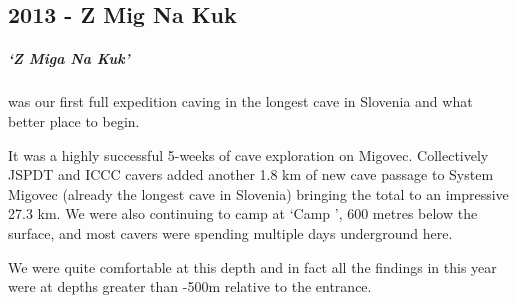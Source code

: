 \begin{tcolorbox}
	\chapter{2013 - Z Mig Na Kuk}
	\paragraph{`Z Miga Na Kuk'} was our first full expedition caving in the longest cave in Slovenia and what better place to begin. 

It was a highly successful 5-weeks of cave exploration on Migovec. Collectively JSPDT and ICCC cavers added another 1.8 km of new cave passage to System Migovec (already the longest cave in Slovenia) bringing the total to an impressive 27.3 km. We were also continuing to camp at `Camp \protect{}', 600 metres below the surface, and most cavers were spending multiple days underground here. 

We were quite comfortable at this depth and in fact all the findings in  this year were at depths greater than -500m relative to the entrance.

\end{tcolorbox}
\BgThispage

